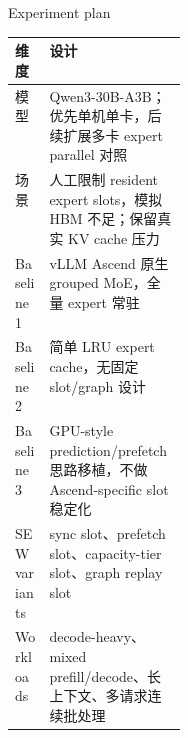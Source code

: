 \documentclass[aspectratio=169,10pt]{beamer}
\begin{document}
\begin{frame}[t]{Experiment plan}
\small
\vspace{-0.35em}

\begin{tabularx}{\linewidth}{p{0.20\linewidth}X}
\toprule
\textbf{维度} & \textbf{设计} \\
\midrule
模型 & Qwen3-30B-A3B；优先单机单卡，后续扩展多卡 expert parallel 对照 \\
场景 & 人工限制 resident expert slots，模拟 HBM 不足；保留真实 KV cache 压力 \\
Baseline 1 & vLLM Ascend 原生 grouped MoE，全量 expert 常驻 \\
Baseline 2 & 简单 LRU expert cache，无固定 slot/graph 设计 \\
Baseline 3 & GPU-style prediction/prefetch 思路移植，不做 Ascend-specific slot 稳定化 \\
SEW variants & sync slot、prefetch slot、capacity-tier slot、graph replay slot \\
Workloads & decode-heavy、mixed prefill/decode、长上下文、多请求连续批处理 \\
\bottomrule
\end{tabularx}
\end{frame}
\end{document}
